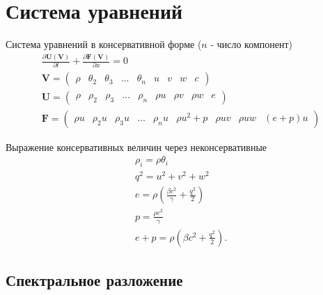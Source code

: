 \documentclass[12pt]{article}
\newcommand{\pd}[2]{\frac{\partial #1}{\partial #2}}
\newcommand{\bvec}[1]{\boldsymbol{\mathbf{#1}}}
\begin{document}
\section{Система уравнений}
Система уравнений в консервативной форме ($n$ - число компонент)
\begin{gather*}
\pd{\bvec U(\bvec V)}{t} + \pd{\bvec F(\bvec V)}{x} = 0\\
\bvec V = \begin{pmatrix}
\rho & \theta_2 & \theta_3 & \dots & \theta_n & u & v & w & c
\end{pmatrix}\\
\bvec U = \begin{pmatrix}
\rho & \rho_2 & \rho_3 & \dots & \rho_n & \rho u & \rho v & \rho w & e
\end{pmatrix}\\
\bvec F = \begin{pmatrix}
\rho u & \rho_2 u & \rho_3 u & \dots & \rho_n u & \rho u^2 + p & \rho u v & \rho u w & (e + p)u
\end{pmatrix}
\end{gather*}

Выражение консервативных величин через неконсервативные
\begin{gather*}
\rho_i = \rho \theta_i\\
q^2 = u^2 + v^2 + w^2\\
e = \rho \left(\frac{\beta c^2}{\gamma}+\frac{q^2}{2}\right)\\
p = \frac{\rho c^2}{\gamma}\\
e + p = \rho \left(\beta c^2+\frac{q^2}{2}\right).
\end{gather*}

\subsection{Спектральное разложение}
\end{document}
